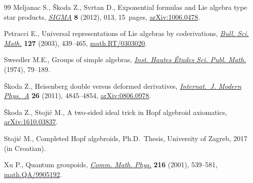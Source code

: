 \begin{thebibliography}{99}
Meljanac S., \v{S}koda Z., Svrtan D., Exponential formulas and {L}ie algebra
 type star products, \href{https://doi.org/10.3842/SIGMA.2012.013}{\textit{SIGMA}} \textbf{8} (2012), 013, 15~pages,
 \href{https://arxiv.org/abs/1006.0478}{arXiv:1006.0478}.

Petracci E., Universal representations of {L}ie algebras by coderivations,
 \href{https://doi.org/10.1016/S0007-4497(03)00041-1}{\textit{Bull. Sci. Math.}} \textbf{127} (2003), 439--465,
 \href{https://arxiv.org/abs/math.RT/0303020}{math.RT/0303020}.

Sweedler M.E., Groups of simple algebras, \href{https://doi.org/10.1007/BF02685882}{\textit{Inst. Hautes \'Etudes Sci.
 Publ. Math.}} (1974), 79--189.

\v{S}koda Z., Heisenberg double versus deformed derivatives,
 \href{https://doi.org/10.1142/S0217751X11054772}{\textit{Internat.~J. Modern Phys.~A}} \textbf{26} (2011), 4845--4854,
 \href{https://arxiv.org/abs/0806.0978}{arXiv:0806.0978}.

\v{S}koda Z., Stoji\'c M., A two-sided ideal trick in {H}opf algebroid
 axiomatics, \href{https://arxiv.org/abs/1610.03837}{arXiv:1610.03837}.

Stoji\'c M., Completed {H}opf algebroids, Ph.D.~Thesis, University of Zagreb, 2017 (in Croatian).

Xu P., Quantum groupoids, \href{https://doi.org/10.1007/s002200000334}{\textit{Comm. Math. Phys.}} \textbf{216} (2001),
 539--581, \href{https://arxiv.org/abs/math.QA/9905192}{math.QA/9905192}.

\end{thebibliography}
